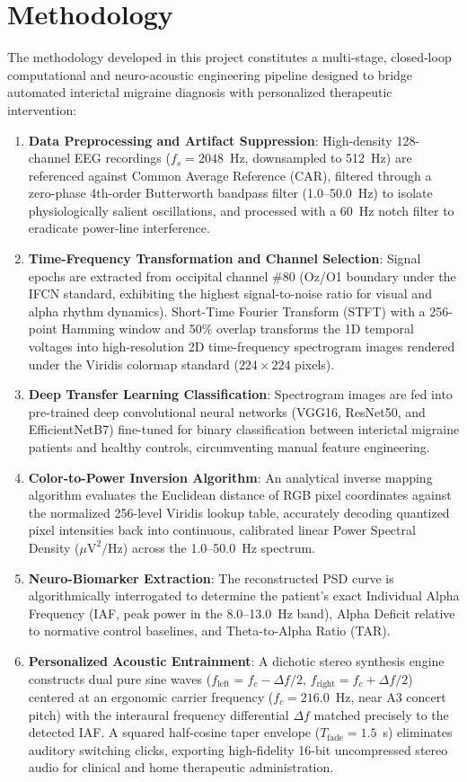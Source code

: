 \documentclass[12pt, a4paper]{report}
\begin{document}
\section{Methodology}
\label{sec:methodology_ch1}
The methodology developed in this project constitutes a multi-stage, closed-loop computational and neuro-acoustic engineering pipeline designed to bridge automated interictal migraine diagnosis with personalized therapeutic intervention:
\begin{enumerate}
    \item \textbf{Data Preprocessing and Artifact Suppression}: High-density 128-channel EEG recordings ($f_s = 2048$~Hz, downsampled to 512~Hz) are referenced against Common Average Reference (CAR), filtered through a zero-phase 4th-order Butterworth bandpass filter (1.0--50.0~Hz) to isolate physiologically salient oscillations, and processed with a 60~Hz notch filter to eradicate power-line interference.
    \item \textbf{Time-Frequency Transformation and Channel Selection}: Signal epochs are extracted from occipital channel \#80 (Oz/O1 boundary under the IFCN standard, exhibiting the highest signal-to-noise ratio for visual and alpha rhythm dynamics). Short-Time Fourier Transform (STFT) with a 256-point Hamming window and 50\% overlap transforms the 1D temporal voltages into high-resolution 2D time-frequency spectrogram images rendered under the Viridis colormap standard ($224 \times 224$ pixels).
    \item \textbf{Deep Transfer Learning Classification}: Spectrogram images are fed into pre-trained deep convolutional neural networks (VGG16, ResNet50, and EfficientNetB7) fine-tuned for binary classification between interictal migraine patients and healthy controls, circumventing manual feature engineering.
    \item \textbf{Color-to-Power Inversion Algorithm}: An analytical inverse mapping algorithm evaluates the Euclidean distance of RGB pixel coordinates against the normalized 256-level Viridis lookup table, accurately decoding quantized pixel intensities back into continuous, calibrated linear Power Spectral Density ($\mu\text{V}^2/\text{Hz}$) across the 1.0--50.0~Hz spectrum.
    \item \textbf{Neuro-Biomarker Extraction}: The reconstructed PSD curve is algorithmically interrogated to determine the patient's exact Individual Alpha Frequency (IAF, peak power in the 8.0--13.0~Hz band), Alpha Deficit relative to normative control baselines, and Theta-to-Alpha Ratio (TAR).
    \item \textbf{Personalized Acoustic Entrainment}: A dichotic stereo synthesis engine constructs dual pure sine waves ($f_{\text{left}} = f_c - \Delta f / 2$, $f_{\text{right}} = f_c + \Delta f / 2$) centered at an ergonomic carrier frequency ($f_c = 216.0$~Hz, near A3 concert pitch) with the interaural frequency differential $\Delta f$ matched precisely to the detected IAF. A squared half-cosine taper envelope ($T_{\text{fade}} = 1.5$~s) eliminates auditory switching clicks, exporting high-fidelity 16-bit uncompressed stereo audio for clinical and home therapeutic administration.
\end{enumerate}
\end{document}
